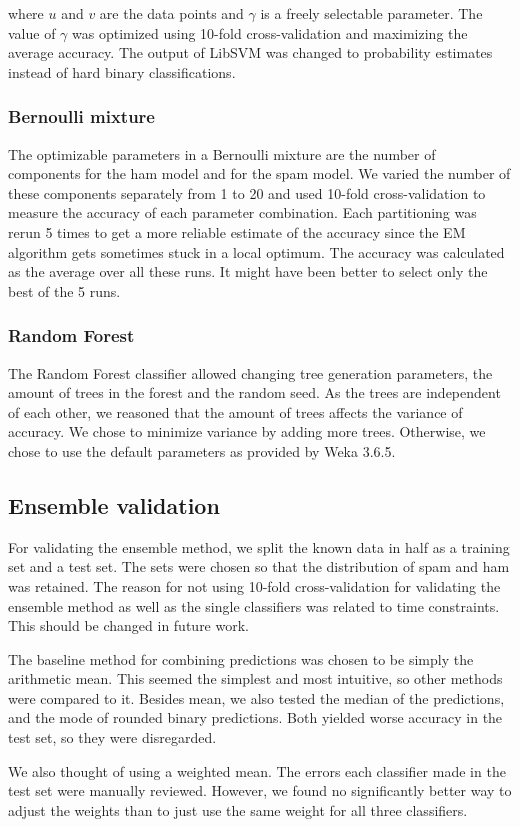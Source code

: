 where $u$ and $v$ are the data points and $\gamma$ is a freely
selectable parameter. The value of $\gamma$ was optimized using 10-fold
cross-validation and maximizing the average accuracy. The output of
LibSVM was changed to probability estimates instead of hard binary
classifications.

\subsubsection{Bernoulli mixture}

The optimizable parameters in a Bernoulli mixture are the number of
components for the ham model and for the spam model. We varied the
number of these components separately from 1 to 20 and used 10-fold
cross-validation to measure the accuracy of each parameter combination.
Each partitioning was rerun 5 times to get a more reliable estimate of
the accuracy since the EM algorithm gets sometimes stuck in a local
optimum. The accuracy was calculated as the average over all these runs.
It might have been better to select only the best of the 5 runs.

\subsubsection{Random Forest}

The Random Forest classifier allowed changing tree generation
parameters, the amount of trees in the forest and the random seed. As
the trees are independent of each other, we reasoned that the amount of
trees affects the variance of accuracy. We chose to minimize variance by
adding more trees. Otherwise, we chose to use the default parameters as
provided by Weka 3.6.5.

\subsection{Ensemble validation}

For validating the ensemble method, we split the known data in half as a
training set and a test set. The sets were chosen so that the
distribution of spam and ham was retained. The reason for not using
10-fold cross-validation for validating the ensemble method as well as
the single classifiers was related to time constraints. This should be
changed in future work.

The baseline method for combining predictions was chosen to be simply
the arithmetic mean. This seemed the simplest and most intuitive, so
other methods were compared to it. Besides mean, we also tested the
median of the predictions, and the mode of rounded binary predictions.
Both yielded worse accuracy in the test set, so they were disregarded.

We also thought of using a weighted mean. The errors each classifier
made in the test set were manually reviewed. However, we found no
significantly better way to adjust the weights than to just use the same
weight for all three classifiers.
